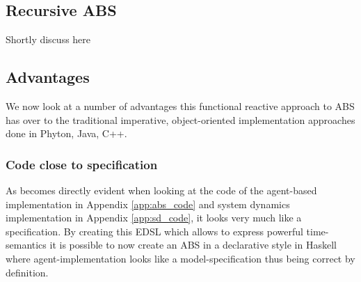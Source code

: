 \subsection{Recursive ABS}
Shortly discuss here

\subsection{Advantages}
We now look at a number of advantages this functional reactive approach to ABS has over to the traditional imperative, object-oriented implementation approaches done in Phyton, Java, C++.

\subsubsection{Code close to specification}
As becomes directly evident when looking at the code of the agent-based implementation in Appendix \ref{app:abs_code} and system dynamics implementation in Appendix \ref{app:sd_code}, it looks very much like a specification. By creating this EDSL which allows to express powerful time-semantics it is possible to now create an ABS in a declarative style in Haskell where agent-implementation looks like a model-specification thus being correct by definition.

